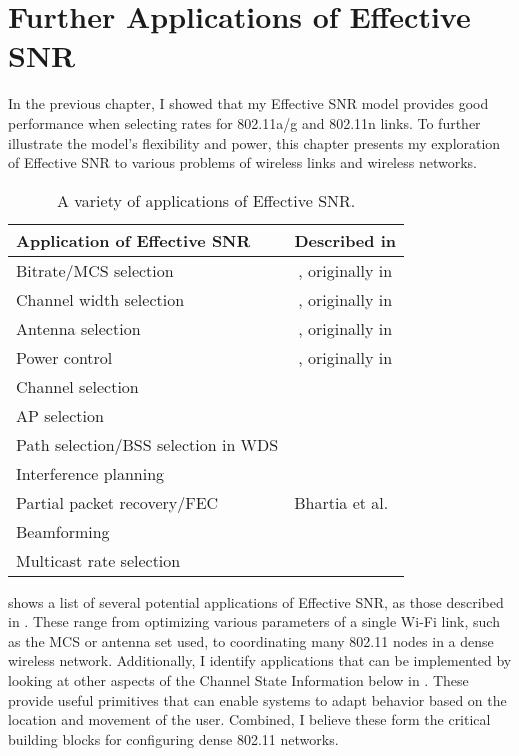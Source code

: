 \ifx\mainfile\undefined

\setcounter{chapter}{7} %
\fi

\cleardoublepage
\chapter{Further Applications of Effective SNR}
\label{chap:applications}

In the previous chapter, I showed that my Effective SNR model provides good performance when selecting rates for 802.11a/g and 802.11n links. To further illustrate the model's flexibility and power, this chapter presents my exploration of Effective SNR to various problems of wireless links and wireless networks.

\begin{table}[htp]
	\centering
	\begin{tabular}{lc}
	\toprule
		\textbf{Application of Effective SNR} & \textbf{Described in} \\
	\midrule
		Bitrate/MCS selection & \chapref{chap:rate}, originally in \cite{Halperin_ESNR}\\
		Channel width selection & \chapref{chap:rate}, originally in \cite{Halperin_ESNR}\\
		Antenna selection & \chapref{chap:rate}, originally in \cite{Halperin_ESNR}\\
		Power control & \chapref{chap:rate}, originally in \cite{Halperin_ESNR}\\
		Channel selection & \secref{sec:esnr_chansel}\\
		AP selection & \secref{sec:esnr_apsel}\\
		Path selection/BSS selection in WDS & \secref{sec:esnr_pathsel}\\
		Interference planning \\
		Partial packet recovery/FEC & Bhartia et al.~\cite{Bhartia_FreqDiv}\\
		Beamforming \\
		Multicast rate selection \\
	\bottomrule
	\end{tabular}
	\caption[A variety of applications of Effective SNR]{\label{tab:esnr_uses}A variety of applications of Effective SNR\@.}
\end{table}

 shows a list of several potential applications of Effective SNR, as those described in . These range from optimizing various parameters of a single Wi-Fi link, such as the MCS or antenna set used, to coordinating many 802.11 nodes in a dense wireless network. Additionally, I identify applications that can be implemented by looking at other aspects of the Channel State Information below in . These provide useful primitives that can enable systems to adapt behavior based on the location and movement of the user. Combined, I believe these form the critical building blocks for configuring dense 802.11 networks.


